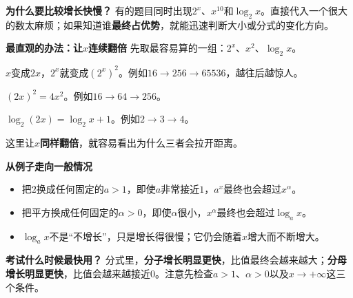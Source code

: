\begin{explanationbox}
	\textbf{\textcolor{CExplanation}{为什么要比较增长快慢？}}
	有的题目同时出现$2^x$、$x^{10}$和$\log_2x$。直接代入一个很大的数太麻烦；如果知道谁\textbf{最终占优势}，就能迅速判断大小或分式的变化方向。

	\medskip
	\textbf{\textcolor{CExplanation}{最直观的办法：让$x$连续翻倍}}
	先取最容易算的一组：$2^x$、$x^2$、$\log_2x$。
	\begin{center}
	
	\end{center}
	\begin{description}[style=nextline,leftmargin=2.8em,labelsep=0.5em,itemsep=0.35em]
		\item[\textbf{指数：把原来的数再平方。}]
			$x$变成$2x$，$2^x$就变成$(2^x)^2$。例如$16\to256\to65536$，越往后越惊人。
		\item[\textbf{平方：每次只变成原来的$4$倍。}]
			$(2x)^2=4x^2$。例如$16\to64\to256$。
		\item[\textbf{对数：每次只增加$1$。}]
			$\log_2(2x)=\log_2x+1$。例如$2\to3\to4$。
	\end{description}
	这里让$x$\textbf{同样翻倍}，就容易看出为什么三者会拉开距离。

	\medskip
	\textbf{\textcolor{CExplanation}{从例子走向一般情况}}
	\begin{itemize}[leftmargin=*,itemsep=0.35em]
		\item 把$2$换成任何固定的$a>1$，即使$a$非常接近$1$，$a^x$最终也会超过$x^\alpha$。
		\item 把平方换成任何固定的$\alpha>0$，即使$\alpha$很小，$x^\alpha$最终也会超过$\log_ax$。
		\item $\log_ax$不是“不增长”，只是增长得很慢；它仍会随着$x$增大而不断增大。
	\end{itemize}

	\medskip
	\textbf{\textcolor{CExplanation}{考试什么时候最快用？}}
	分式里，\textbf{分子增长明显更快}，比值最终会越来越大；\textbf{分母增长明显更快}，比值会越来越接近$0$。注意先检查$a>1$、$\alpha>0$以及$x\to+\infty$这三个条件。
\end{explanationbox}
